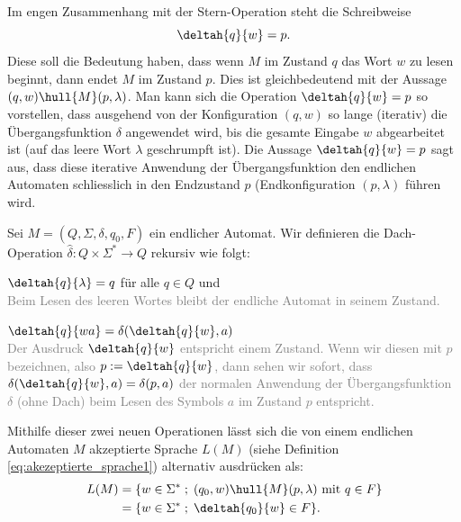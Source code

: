 Im engen Zusammenhang mit der Stern-Operation steht die Schreibweise
\begin{equation*}
	\deltah{q}{w} = p.
\end{equation*}
Diese soll die Bedeutung haben, dass wenn $M$ im Zustand $q$ das Wort $w$ zu lesen beginnt, dann endet $M$ im Zustand $p$. Dies ist gleichbedeutend mit der Aussage $(q,w)\hull{M} (p,\lambda)$. Man kann sich die Operation $\deltah{q}{w} = p$ so vorstellen, dass ausgehend von der Konfiguration $(q,w)$ so lange (iterativ) die Übergangsfunktion $\delta$ angewendet wird, bis die gesamte Eingabe $w$ abgearbeitet ist (auf das leere Wort $\lambda$ geschrumpft ist). Die Aussage $\deltah{q}{w} = p$ sagt aus, dass diese iterative Anwendung der Übergangsfunktion den endlichen Automaten schliesslich in den Endzustand $p$ (Endkonfiguration $(p,\lambda)$ führen wird.
\begin{mydefinition}\label{mydefinition:dach_operation}
Sei $M = (Q,\Sigma, \delta, q_0, F)$ ein endlicher Automat. Wir definieren die Dach-Operation $\widehat{\delta}: Q\times \Sigma^* \to Q$ rekursiv wie folgt:
\begin{renum}
	\item $\deltah{q}{\lambda} = q$ für alle $q\in Q$ und\\
	\textcolor{Gray}{Beim Lesen des leeren Wortes bleibt der endliche Automat in seinem Zustand.}
	\item $\deltah{q}{wa} = \delta (\deltah{q}{w},a)$\\
	\textcolor{Gray}{Der Ausdruck $\deltah{q}{w}$ entspricht einem Zustand. Wenn wir diesen mit $p$ bezeichnen, also $p:= \deltah{q}{w}$, dann sehen wir sofort, dass $\delta(\deltah{q}{w},a) = \delta(p,a)$ der normalen Anwendung der Übergangsfunktion $\delta$ (ohne Dach) beim Lesen des Symbols $a$ im Zustand $p$ entspricht.}
\end{renum}
\end{mydefinition}
Mithilfe dieser zwei neuen Operationen lässt sich die von einem endlichen Automaten $M$ akzeptierte Sprache $L(M)$ (siehe Definition \cref{eq:akezeptierte_sprache1}) alternativ ausdrücken als:
\begin{equation*}
	\begin{split}
		L(M) & = \{ w\in\Sigma^* \; ; \; (q_0,w) \hull{M} (p,\lambda) \text{ mit } q\in F\} \\
		     & = \{ w\in\Sigma^* \; ; \; \deltah{q_0}{w}\in F\}.
	\end{split}
\end{equation*}

